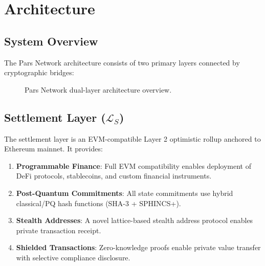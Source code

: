 \documentclass[11pt,a4paper,twocolumn]{article}
\begin{document}
\section{Architecture}
\label{sec:architecture}

\subsection{System Overview}

The Pars Network architecture consists of two primary layers connected by cryptographic bridges:

\begin{figure}[H]
\centering
{}
\caption{Pars Network dual-layer architecture overview.}
\label{fig:architecture}
\end{figure}

\subsection{Settlement Layer ($\mathcal{L}_S$)}

The settlement layer is an EVM-compatible Layer 2 optimistic rollup anchored to Ethereum mainnet. It provides:

\begin{enumerate}[leftmargin=*]
  \item \textbf{Programmable Finance}: Full EVM compatibility enables deployment of DeFi protocols, stablecoins, and custom financial instruments.
  \item \textbf{Post-Quantum Commitments}: All state commitments use hybrid classical/PQ hash functions (SHA-3 + SPHINCS+).
  \item \textbf{Stealth Addresses}: A novel lattice-based stealth address protocol enables private transaction receipt.
  \item \textbf{Shielded Transactions}: Zero-knowledge proofs enable private value transfer with selective compliance disclosure.
\end{enumerate}
\end{document}
